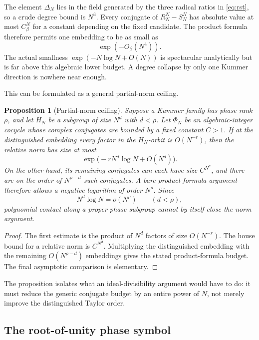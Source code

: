 \documentclass[11pt]{article}
\newtheorem{proposition}[theorem]{Proposition}
\theoremstyle{definition}
\theoremstyle{remark}
\begin{document}
The element $\Delta_N$ lies in the field generated by the three radical ratios
in \eqref{eq:rst}, so a crude degree bound is $N^3$.  Every conjugate of
$R_N^N-S_N^N$ has absolute value at most $C_\beta^N$ for a constant depending on
the fixed candidate.  The product formula therefore permits one embedding to be
as small as
\begin{equation}\label{eq:liouvillebudget}
 \exp(-O_\beta(N^4)).
\end{equation}
The actual smallness $\exp(-N\log N+O(N))$ is spectacular analytically but is far
above this algebraic lower budget.  A degree collapse by only one Kummer
direction is nowhere near enough.

This can be formulated as a general partial-norm ceiling.

\begin{proposition}[Partial-norm ceiling]\label{prop:partialnormceiling}
Suppose a Kummer family has phase rank $\rho$, and let $H_N$ be a subgroup of
size $N^d$ with $d<\rho$.  Let $\Phi_N$ be an algebraic-integer cocycle whose
complex conjugates are bounded by a fixed constant $C>1$.  If at the
distinguished embedding every factor in the $H_N$-orbit is
$O(N^{-r})$, then the relative norm has size at most
\[
 \exp\bigl(-rN^d\log N+O(N^d)\bigr).
\]
On the other hand, its remaining conjugates can each have size
$C^{N^d}$, and there are on the order of $N^{\rho-d}$ such conjugates.  A bare
product-formula argument therefore allows a negative logarithm of order
$N^\rho$.  Since
\[
 N^d\log N=o(N^\rho)\qquad(d<\rho),
\]
polynomial contact along a proper phase subgroup cannot by itself close the
norm argument.
\end{proposition}

\begin{proof}
The first estimate is the product of $N^d$ factors of size $O(N^{-r})$.  The
house bound for a relative norm is $C^{N^d}$.  Multiplying the distinguished
embedding with the remaining $O(N^{\rho-d})$ embeddings gives the stated
product-formula budget.  The final asymptotic comparison is elementary.
\end{proof}

The proposition isolates what an ideal-divisibility argument would have to do:
it must reduce the generic conjugate budget by an entire power of $N$, not merely
improve the distinguished Taylor order.

\subsection{The root-of-unity phase symbol}
\end{document}
